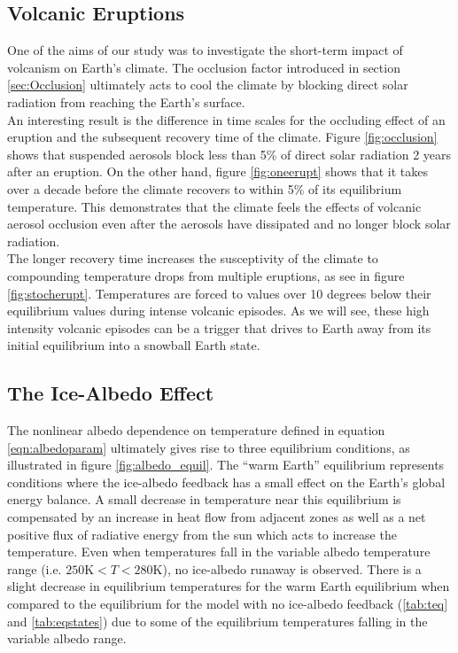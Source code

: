 \documentclass[12pt]{article}
\begin{document}
\subsection{Volcanic Eruptions}
One of the aims of our study was to investigate the short-term impact of
volcanism on Earth's climate. The occlusion factor introduced in section
\ref{sec:Occlusion} ultimately acts to cool the climate by blocking direct
solar radiation from reaching the Earth's surface.\\

An interesting result is the difference in time scales for the occluding effect
of an eruption and the subsequent recovery time of the climate. Figure
\ref{fig:occlusion} shows that suspended aerosols block less than 5\% of
direct solar radiation 2 years after an eruption. On the other hand, figure
\ref{fig:oneerupt} shows that it takes over a decade before the climate recovers
to within 5\% of its equilibrium temperature. This demonstrates that the climate
feels the effects of volcanic aerosol occlusion even after the aerosols have
dissipated and no longer block solar radiation. \\

The longer recovery time increases the susceptivity of the climate to compounding
temperature drops from multiple eruptions, as see in figure \ref{fig:stocherupt}.
Temperatures are forced to values over 10 degrees below their equilibrium values
during intense volcanic episodes. As we will see, these high intensity volcanic
episodes can be a trigger that drives to Earth away from its initial equilibrium
into a snowball Earth state.

\subsection{The Ice-Albedo Effect}
The nonlinear albedo dependence on temperature defined in equation
\ref{eqn:albedoparam} ultimately gives rise to three equilibrium
conditions, as illustrated in figure \ref{fig:albedo_equil}. The ``warm Earth''
equilibrium represents conditions where the ice-albedo feedback has a small
effect on the Earth's global energy balance. A small decrease in temperature
near this equilibrium is compensated by an increase in heat flow from adjacent
zones as well as a net positive flux of radiative energy from the sun which acts to
increase the temperature. Even when
temperatures fall in the variable albedo temperature range
(i.e. $250 \text{K} < T < 280 \text{K}$), no ice-albedo runaway is observed.
There is a slight decrease in equilibrium temperatures
for the warm Earth equilibrium when compared to the equilibrium for the model with
no ice-albedo feedback (\ref{tab:teq} and \ref{tab:eqstates}) due to some of
the equilibrium temperatures falling in the variable albedo range.
\end{document}
